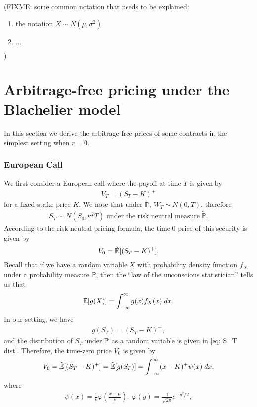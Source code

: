 \documentclass[reqno]{amsart}
\begin{document}
(FIXME: some common notation that needs to be explained: 
\begin{enumerate}
      \item the notation $X \sim N(\mu,\sigma^2)$
      \item $\ldots$
\end{enumerate}
)

\section{Arbitrage-free pricing under the Blachelier model}
In this section we derive the arbitrage-free prices of some contracts in the simplest setting when $r = 0$.  

\subsubsection{European Call}
We first consider a European call where the payoff at time $T$ is given by 
\begin{align}
	 V_T = (S_T - K)^+
\end{align}
for a fixed strike price $K$. We note that under $\tilde{\mathbb{P}}$, $ W_T \sim N(0, T)$, therefore
\begin{align}\label{eq: S_T dist}
S_T \sim N(S_0, \kappa^2T) \; \text{under the risk neutral measure} \; \tilde{\mathbb{P}}.
\end{align}
According to the risk neutral pricing formula, the time-0 price of this security is given by 
\begin{align}
	 V_0 = \tilde{\mathbb{E}}[(S_T - K)^+].
\end{align}
Recall that if we have a random variable $X$ with probability density function $f_X$ under a probability measure $\mathbb{P}$, then the ``law of the unconscious statistician'' tells us that 
\begin{align}
	 \mathbb{E}[g(X)] = \int_{-\infty}^\infty g(x) f_X(x) \; dx.
\end{align}
In our setting, we have 
\begin{align}
	 g(S_T) = (S_T - K)^+,
\end{align}
and the distribution of $S_T$ under $\tilde{\mathbb{P}}$ as a random variable is given in \eqref{eq: S_T dist}. Therefore, the time-zero price $V_0$ is given by 
\begin{align}\label{eq: call int}
	 V_0 = \tilde{\mathbb{E}}[(S_T - K)^+] =  \tilde{\mathbb{E}}[g(S_T)] = \int_{-\infty}^\infty (x-K)^+ \psi(x) \; dx,
\end{align}
where 
\begin{align}
	 \psi(x) = \frac{1}{\nu}\varphi\left(\frac{x-\mu}{\nu}\right), \; \varphi(y) = \frac{1}{\sqrt{2\pi}}e^{-y^2/2}, 
\end{align}
\end{document}
